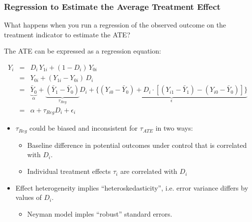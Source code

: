 \documentclass{beamer}
\numberwithin{equation}{section}
\begin{document}
\begin{frame}
  \frametitle{Regression to Estimate the Average Treatment Effect}
\small

What happens when you run a regression of the observed outcome on the treatment indicator to estimate the ATE?\\\bigskip

The ATE can be expressed as a regression equation:

\begin{eqnarray*}
  Y_i &=& D_i\, Y_{1i} + (1-D_i)\, Y_{0i} \\
   &=& Y_{0i} + (Y_{1i}- Y_{0i})\,D_i \\
   &=& \underbrace{\bar Y_0}_{\alpha} + \underbrace{(\bar Y_1 - \bar Y_0)}_{\tau_{Reg}} D_i + \underbrace{\{(Y_{i0} - \bar Y_0) + D_i \cdot [(Y_{i1} - \bar Y_1) - (Y_{i0} - \bar Y_0)] \}}_{\epsilon} \\ 
   &=& \alpha + \tau_{Reg} D_i + \epsilon_i
 \end{eqnarray*}
 
\begin{itemize}
\item   $\tau_{Reg}$ could be biased and inconsistent for $\tau_{ATE}$ in two ways: \pause
  \begin{itemize}
  \item Baseline difference in potential outcomes under control that is correlated with $D_i$. 
  \item Individual treatment effects $\tau_i$ are correlated with $D_i$ 
  \end{itemize}\pause
\item
  Effect heterogeneity implies ``heteroskedasticity'', i.e. error variance differs by values of $D_i$.
  \begin{itemize}
  \item  Neyman model imples ``robust'' standard errors. 
  \end{itemize}
  
\end{itemize}

\end{frame}
\end{document}
